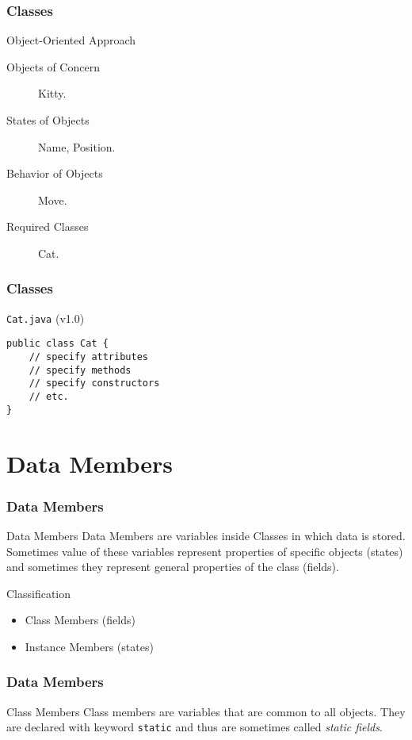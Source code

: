 \documentclass[10pt, compress]{beamer}
\begin{document}
\begin{frame}[fragile]
	\frametitle{Classes}
	\begin{block}{Object-Oriented Approach}
	\begin{description}
		\item[Objects of Concern] Kitty.
		\item[States of Objects] Name, Position.
		\item[Behavior of Objects] Move.
		\item[Required Classes] Cat.
	\end{description}
	\end{block}
\end{frame}

\begin{frame}[fragile]
	\frametitle{Classes}
	\begin{block}{\texttt{Cat.java} (v1.0)}
		\begin{verbatim}
public class Cat {
	// specify attributes
	// specify methods
	// specify constructors
	// etc.
}
		\end{verbatim}
	\end{block}
\end{frame}

\section{Data Members}

\begin{frame}[fragile]
	\frametitle{Data Members}
	\begin{block}{Data Members}
		Data Members are variables inside Classes in which data is stored. Sometimes value of these variables represent properties of specific objects (states) and sometimes they represent general properties of the class (fields).
	\end{block}
	\begin{block}{Classification}
	\begin{itemize}
		\item[] Class Members (fields)
		\item[] Instance Members (states)
	\end{itemize}
	\end{block}
\end{frame}

\begin{frame}[fragile]
	\frametitle{Data Members}
	\begin{block}{Class Members}
	Class members are variables that are common to all objects. They are declared with keyword \texttt{static} and thus are sometimes called \emph{static fields}.
	\end{block}
\end{frame}
\end{document}
